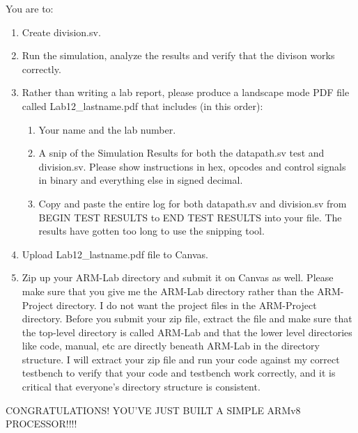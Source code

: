 You are to:
\begin{enumerate}
	\item Create division.sv.
	\item Run the simulation, analyze the results and verify that the divison works correctly.
	\item Rather than writing a lab report, please produce a landscape mode PDF file called Lab12\_lastname.pdf that includes (in this order):
	\begin{enumerate}
		\item Your name and the lab number.
		\item A snip of the Simulation Results for both the datapath.sv test and division.sv.  Please show instructions in hex, opcodes and control signals in binary and everything else in signed decimal.  
		\item Copy and paste the entire log for both datapath.sv and division.sv from BEGIN TEST RESULTS to END TEST RESULTS into your file.  The results have gotten too long to use the snipping tool.	
	\end{enumerate}
\item Upload Lab12\_lastname.pdf file to Canvas.
\item Zip up your ARM-Lab directory and submit it on Canvas as well.  Please make sure that you give me the ARM-Lab directory rather than the ARM-Project directory.  I do not want the project files in the ARM-Project directory.  Before you submit your zip file, extract the file and make sure that the top-level directory is called ARM-Lab and that the lower level directories like code, manual, etc are directly beneath ARM-Lab in the directory structure.  I will extract your zip file and run your code against my correct testbench to verify that your code and testbench work correctly, and it is critical that everyone's directory structure is consistent.
\end{enumerate} 

CONGRATULATIONS!  YOU'VE JUST BUILT A SIMPLE ARMv8 PROCESSOR!!!!